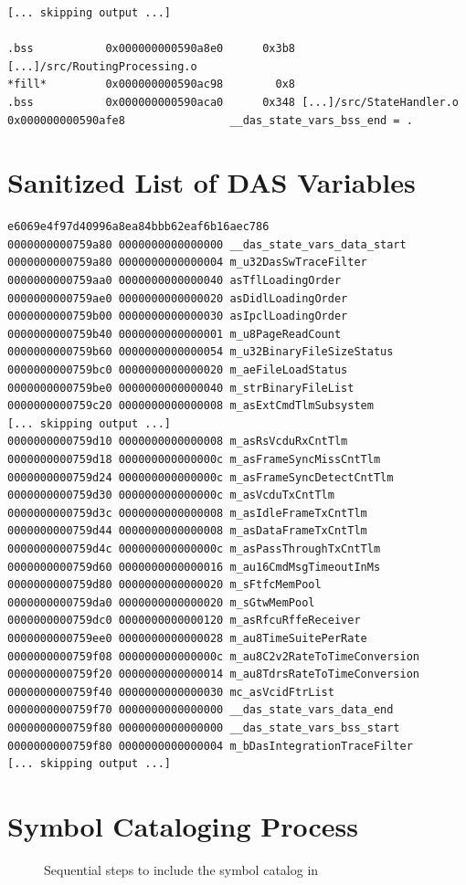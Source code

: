 {{\begin{verbatim}
[... skipping output ...]

.bss           0x000000000590a8e0      0x3b8 [...]/src/RoutingProcessing.o
*fill*         0x000000000590ac98        0x8 
.bss           0x000000000590aca0      0x348 [...]/src/StateHandler.o
0x000000000590afe8                __das_state_vars_bss_end = .
\end{verbatim}
}
\chapter{Sanitized List of DAS Variables}\label{das-symbol-catalog}

{\small
\begin{verbatim}
e6069e4f97d40996a8ea84bbb62eaf6b16aec786
0000000000759a80 0000000000000000 __das_state_vars_data_start
0000000000759a80 0000000000000004 m_u32DasSwTraceFilter
0000000000759aa0 0000000000000040 asTflLoadingOrder
0000000000759ae0 0000000000000020 asDidlLoadingOrder
0000000000759b00 0000000000000030 asIpclLoadingOrder
0000000000759b40 0000000000000001 m_u8PageReadCount
0000000000759b60 0000000000000054 m_u32BinaryFileSizeStatus
0000000000759bc0 0000000000000020 m_aeFileLoadStatus
0000000000759be0 0000000000000040 m_strBinaryFileList
0000000000759c20 0000000000000008 m_asExtCmdTlmSubsystem
[... skipping output ...]
0000000000759d10 0000000000000008 m_asRsVcduRxCntTlm
0000000000759d18 000000000000000c m_asFrameSyncMissCntTlm
0000000000759d24 000000000000000c m_asFrameSyncDetectCntTlm
0000000000759d30 000000000000000c m_asVcduTxCntTlm
0000000000759d3c 0000000000000008 m_asIdleFrameTxCntTlm
0000000000759d44 0000000000000008 m_asDataFrameTxCntTlm
0000000000759d4c 000000000000000c m_asPassThroughTxCntTlm
0000000000759d60 0000000000000016 m_au16CmdMsgTimeoutInMs
0000000000759d80 0000000000000020 m_sFtfcMemPool
0000000000759da0 0000000000000020 m_sGtwMemPool
0000000000759dc0 0000000000000120 m_asRfcuRffeReceiver
0000000000759ee0 0000000000000028 m_au8TimeSuitePerRate
0000000000759f08 000000000000000c m_au8C2v2RateToTimeConversion
0000000000759f20 0000000000000014 m_au8TdrsRateToTimeConversion
0000000000759f40 0000000000000030 mc_asVcidFtrList
0000000000759f70 0000000000000000 __das_state_vars_data_end
0000000000759f80 0000000000000000 __das_state_vars_bss_start
0000000000759f80 0000000000000004 m_bDasIntegrationTraceFilter
[... skipping output ...]

\end{verbatim}
}

\chapter{Symbol Cataloging Process}
\begin{figure}[H]
	\centering
	
	\caption{Sequential steps to include the symbol catalog in }
	\label{fig:blackbox-diagram}
\end{figure}

}
